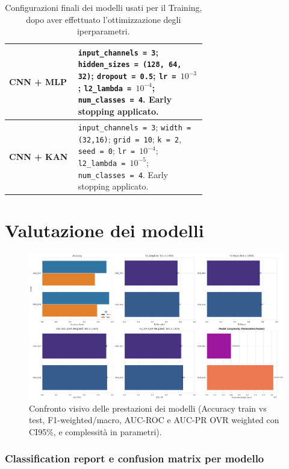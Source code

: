 \documentclass[a4paper,12pt]{report}
\begin{document}
	\begin{table}[H]
		\centering
		\caption{Configurazioni finali dei modelli usati per il Training, dopo aver effettuato l'ottimizzazione degli iperparametri.}
		\label{tab:model-config-image}
		\begin{tabular}{l p{0.65\linewidth}}
			\toprule
			\textbf{CNN + MLP} & \texttt{input\_channels = 3}; \texttt{hidden\_sizes = (128, 64, 32)}; \texttt{dropout = 0.5}; \texttt{lr = $10^{-3}$}; \texttt{l2\_lambda = $10^{-4}$}; \texttt{num\_classes = 4}. Early stopping applicato. \\
			\midrule
			\textbf{CNN + KAN} & \texttt{input\_channels = 3}; \texttt{width = (32,16)}; \texttt{grid = 10}; \texttt{k = 2}, \texttt{seed = 0}; \texttt{lr = $10^{-4}$}; \texttt{l2\_lambda = $10^{-5}$}; \texttt{num\_classes = 4}. Early stopping applicato. \\
			\bottomrule
		\end{tabular}
	\end{table}
	
	\section{Valutazione dei modelli}
	
	\begin{figure}[H]
		\centering
		\includegraphics[width=1.0\textwidth]{img/comparison_image.png}
		\caption{Confronto visivo delle prestazioni dei modelli (Accuracy train vs test, F1-weighted/macro, AUC-ROC e AUC-PR OVR weighted con CI95\%, e complessità in parametri).}
		\label{fig:comparison_image}
	\end{figure}
	
	\subsubsection{Classification report e confusion matrix per modello}
	
\end{document}
